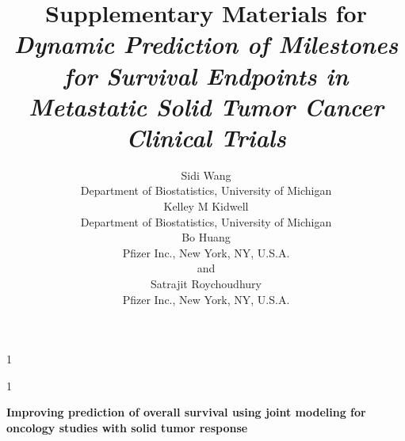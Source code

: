 \documentclass[12pt]{article}
\newcommand{\blind}{1}
\begin{document}


\def\spacingset#1{\renewcommand{\baselinestretch}%
{#1}\small\normalsize} \spacingset{1}



\blind
{
  \title{\bf Supplementary Materials for \textit{Dynamic Prediction of Milestones for Survival Endpoints in Metastatic Solid Tumor Cancer Clinical Trials}}
  \author{Sidi Wang\\
    Department of Biostatistics, University of Michigan\\
    Kelley M Kidwell \\
    Department of Biostatistics, University of Michigan\\
    Bo Huang \\
    Pfizer Inc., New York, NY, U.S.A. \\
    and \\
    Satrajit Roychoudhury \\
    Pfizer Inc., New York, NY, U.S.A.}
  \maketitle
} \fi

\blind
{
  \bigskip
  \bigskip
  \bigskip
  \begin{center}
    {\LARGE\bf Improving prediction of overall survival using joint modeling for oncology studies with solid tumor response}
\end{center}
  \medskip
} \fi

\bigskip


\noindent%

\vfill
\end{document}
